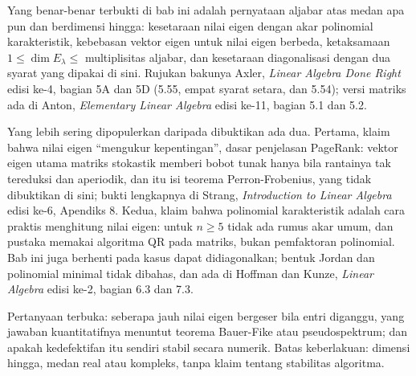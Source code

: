 \begin{untukpeneliti}
Yang benar-benar terbukti di bab ini adalah pernyataan aljabar atas medan apa pun dan berdimensi
hingga: kesetaraan nilai eigen dengan akar polinomial karakteristik, kebebasan vektor eigen untuk
nilai eigen berbeda, ketaksamaan $1\le\dim E_{\lambda}\le$ multiplisitas aljabar, dan kesetaraan
diagonalisasi dengan dua syarat yang dipakai di sini. Rujukan bakunya Axler, \emph{Linear Algebra
Done Right} edisi ke-4, bagian 5A dan 5D (5.55, empat syarat setara, dan 5.54); versi matriks ada
di Anton, \emph{Elementary Linear Algebra} edisi ke-11, bagian 5.1 dan 5.2.

Yang lebih sering dipopulerkan daripada dibuktikan ada dua. Pertama, klaim bahwa nilai eigen
``mengukur kepentingan'', dasar penjelasan PageRank: vektor eigen utama matriks stokastik memberi
bobot tunak hanya bila rantainya tak tereduksi dan aperiodik, dan itu isi teorema Perron-Frobenius,
yang tidak dibuktikan di sini; bukti lengkapnya di Strang, \emph{Introduction to Linear Algebra}
edisi ke-6, Apendiks 8. Kedua, klaim bahwa polinomial karakteristik adalah cara praktis menghitung
nilai eigen: untuk $n\ge5$ tidak ada rumus akar umum, dan pustaka memakai algoritma QR pada
matriks, bukan pemfaktoran polinomial. Bab ini juga berhenti pada kasus dapat didiagonalkan; bentuk
Jordan dan polinomial minimal tidak dibahas, dan ada di Hoffman dan Kunze, \emph{Linear Algebra}
edisi ke-2, bagian 6.3 dan 7.3.

Pertanyaan terbuka: seberapa jauh nilai eigen bergeser bila entri diganggu, yang jawaban
kuantitatifnya menuntut teorema Bauer-Fike atau pseudospektrum; dan apakah kedefektifan itu sendiri
stabil secara numerik. Batas keberlakuan: dimensi hingga, medan real atau kompleks, tanpa klaim
tentang stabilitas algoritma.
\end{untukpeneliti}

